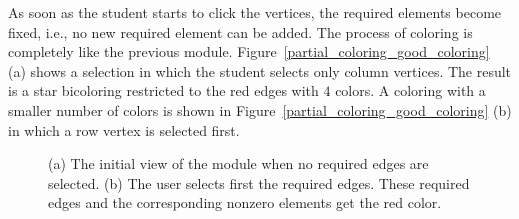 \documentclass[12pt, twoside,a4paper,toc=bibliography]{scrbook}
\begin{document}
As soon as the student starts to click the vertices, the required elements
become fixed, i.e., no new required element can be added.
The process of coloring is completely like the previous module.
Figure~\ref{partial_coloring_good_coloring} (a) shows a selection in which
the student selects only column vertices. The result is a star bicoloring
restricted to the red edges with $4$ colors.
A coloring with a smaller number of colors
is shown in Figure~\ref{partial_coloring_good_coloring} (b)
in which a row vertex is selected first.

\begin{figure}
\centering
{}
\hfill
{}
\caption{
(a) The initial view of the module when no required edges are selected.
(b) The user selects first the required edges. These required edges and the corresponding
nonzero elements get the red color.}
\label{partial_coloring_bad_coloring}
\end{figure}
\end{document}
